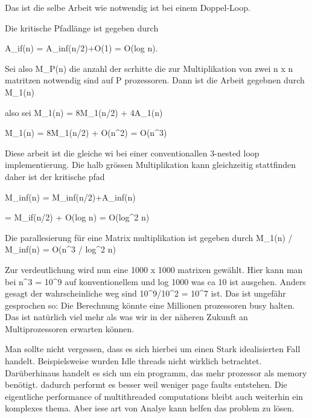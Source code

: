 Das ist die selbe Arbeit wie notwendig ist bei einem Doppel-Loop.


Die kritische Pfadlänge ist gegeben durch 

A_if(n) = A_inf(n/2)+O(1) = O(log n).


Sei also M_P(n) die anzahl der scrhitte die zur Multiplikation von zwei n x n matritzen notwendig sind auf P prozessoren. Dann ist die Arbeit gegebnen durch M_1(n) 

also sei
M_1(n) = 8M_1(n/2) + 4A_1(n)

M_1(n) = 8M_1(n/2) + O(n^2)
= O(n^3)


Diese arbeit ist die gleiche wi bei einer conventionallen 3-nested loop implementierung. Die halb grössen Multiplikation kann gleichzeitig stattfinden daher ist der kritische pfad

M_inf(n) = M_inf(n/2)+A_inf(n)

= M_if(n/2) + O(log n)
= O(log^2 n)

Die parallesierung für eine Matrix multiplikation ist gegeben durch M_1(n) / M_inf(n) = O(n^3 / log^2 n)


Zur verdeutlichung wird nun eine 1000 x 1000 matrixen gewählt. Hier kann man bei 
n^3 = 10^9 
auf konventionellem und log 1000 was ca 10 ist ausgehen. Anders gesagt der wahrscheinliche weg sind 
10^9/10^2 = 10^7 
ist. Das ist ungefähr gesprochen so: Die Berechnung könnte eine Millionen prozessoren busy halten. Das ist natürlich viel mehr als was wir in der näheren Zukunft an Multiprozessoren erwarten können. 


Man sollte nicht vergessen, dass es sich hierbei um einen Stark idealisierten Fall handelt. Beispielsweise wurden Idle threads nicht wirklich betrachtet. Darüberhinaus handelt es sich um ein programm, das mehr prozessor als memory benötigt. dadurch performt es besser weil weniger page faults entstehen. Die eigentliche performance of multithreaded computations bleibt auch weiterhin ein komplexes thema. Aber iese art von Analye kann helfen das problem zu lösen.